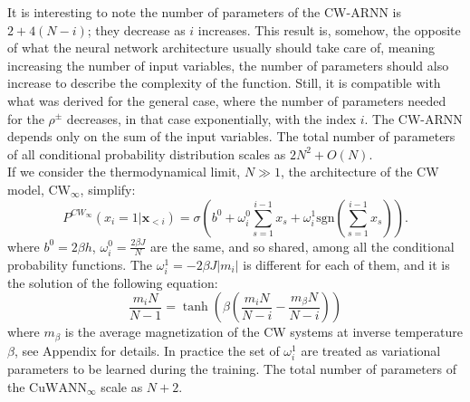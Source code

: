 \documentclass[aps,physrev,10pt,floatfix,reprint]{revtex4-2}
\begin{document}
It is interesting to note the number of parameters of the CW-ARNN is $2+4(N-i)$; they decrease as $i$ increases. This result is, somehow, the opposite of what the neural network architecture usually should take care of, meaning increasing the number of input variables, the number of parameters should also increase to describe the complexity of the function. Still, it is compatible with what was derived for the general case, where the number of parameters needed for the $\rho^{\pm}$ decreases, in that case exponentially, with the index $i$. The CW-ARNN depends only on the sum of the input variables.
The total number of parameters of all conditional probability distribution scales as $2N^2+ O(N)$. \\
If we consider the thermodynamical limit, $N \gg 1$, the architecture of the CW model, $\text{CW}_{\infty}$, simplify:
\begin{equation*}
    P^{CW_{\infty}}\left(x_{i}=1|\mathbf{x}_{<i}\right) =  \sigma \left(b^0+\omega_{i}^0\sum_{s=1}^{i-1}x_{s} + \omega_i^1 \text{sgn}(\sum_{s=1}^{i-1}x_{s})\right).
\end{equation*}
where $b^0=2\beta h$, $\omega^0_i = \frac{2\beta J}{N}$ are the same, and so shared, among all the conditional probability functions. The $\omega^1_i = -2\beta J |m_i|$ is different for each of them, and it is the solution of the following equation:
\begin{equation}
    \frac{m_i N}{N-1} = \tanh \left( \beta(\frac{m_i N}{N - i} - \frac{m_{\beta}N}{N-i}) \right)
    \label{eq:extrem_i}
    \end{equation}
where $m_{\beta}$ is the average magnetization of the CW systems at inverse temperature $\beta$, see Appendix for details. In practice the set of $\omega^1_i$ are treated as variational parameters to be learned during the training. The total number of parameters of the $\text{CuWANN}_{\infty}$ scale as $N+2$.
    
\end{document}
